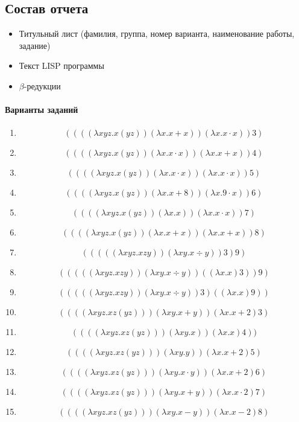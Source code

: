 \documentclass[a4paper,12pt]{article}
\begin{document}
\subsection{Состав отчета}
\begin{itemize}
	\item Титульный лист (фамилия, группа, номер варианта, наименование работы, задание)
	\item Текст LISP программы
	\item $\beta$-редукции
\end{itemize}

\paragraph{Варианты заданий}
\begin{enumerate}
	\item \[ ((((\lambda xyz.x(yz))(\lambda x.x+x))(\lambda x.x\cdot x))3) \]
	\item \[ ((((\lambda xyz.x(yz))(\lambda x.x\cdot x))(\lambda x.x+x))4) \]
	\item \[ ((((\lambda xyz.x(yz))(\lambda x.x\cdot x))(\lambda x.x\cdot x))5) \]
	\item \[ ((((\lambda xyz.x(yz))(\lambda x.x+8))(\lambda x.9\cdot x))6) \]
	\item \[ ((((\lambda xyz.x(yz))(\lambda x.x))(\lambda x.x\cdot x))7)\]
	\item \[ ((((\lambda xyz.x(yz))(\lambda x.x+x))(\lambda x.x+x))8)\]
	\item \[ (((((\lambda xyz.xzy))(\lambda xy.x\div y))3)9)\]
	\item \[ (((((\lambda xyz.xzy))(\lambda xy.x\div y))((\lambda x.x)3))9)\]
	\item \[ (((((\lambda xyz.xzy))(\lambda xy.x\div y))3)((\lambda x.x)9))\]
	\item \[ ((((\lambda xyz.xz(yz)))(\lambda xy.x+y))(\lambda x.x+2)3)\]
	\item \[ ((((\lambda xyz.xz(yz)))(\lambda xy.x))(\lambda x.x)4))\]
	\item \[ ((((\lambda xyz.xz(yz)))(\lambda xy.y))(\lambda x.x+2)5)\]
	\item \[ ((((\lambda xyz.xz(yz)))(\lambda xy.x\cdot y))(\lambda x.x+2)6)\]
	\item \[ ((((\lambda xyz.xz(yz)))(\lambda xy.x+y))(\lambda x.x\cdot 2)7)\]
	\item \[ ((((\lambda xyz.xz(yz)))(\lambda xy.x-y))(\lambda x.x-2)8)\]
\end{enumerate}
\end{document}
